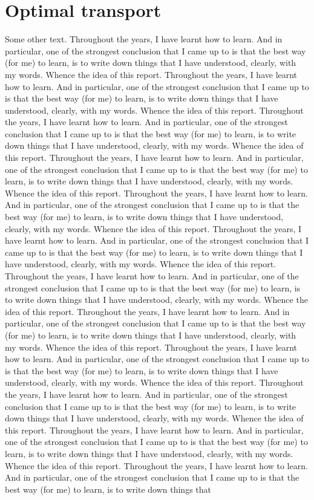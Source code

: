\documentclass[12pt]{book}
\begin{document}
\chapter*{Optimal transport}
Some other text. Throughout the years, I have learnt how to learn. And in particular, one of the strongest conclusion that I came up to is that the best way (for me) to learn, is to write down things that I have understood, clearly, with my words. Whence the idea of this report. Throughout the years, I have learnt how to learn. And in particular, one of the strongest conclusion that I came up to is that the best way (for me) to learn, is to write down things that I have understood, clearly, with my words. Whence the idea of this report. Throughout the years, I have learnt how to learn. And in particular, one of the strongest conclusion that I came up to is that the best way (for me) to learn, is to write down things that I have understood, clearly, with my words. Whence the idea of this report. Throughout the years, I have learnt how to learn. And in particular, one of the strongest conclusion that I came up to is that the best way (for me) to learn, is to write down things that I have understood, clearly, with my words. Whence the idea of this report. Throughout the years, I have learnt how to learn. And in particular, one of the strongest conclusion that I came up to is that the best way (for me) to learn, is to write down things that I have understood, clearly, with my words. Whence the idea of this report. Throughout the years, I have learnt how to learn. And in particular, one of the strongest conclusion that I came up to is that the best way (for me) to learn, is to write down things that I have understood, clearly, with my words. Whence the idea of this report. Throughout the years, I have learnt how to learn. And in particular, one of the strongest conclusion that I came up to is that the best way (for me) to learn, is to write down things that I have understood, clearly, with my words. Whence the idea of this report. Throughout the years, I have learnt how to learn. And in particular, one of the strongest conclusion that I came up to is that the best way (for me) to learn, is to write down things that I have understood, clearly, with my words. Whence the idea of this report. Throughout the years, I have learnt how to learn. And in particular, one of the strongest conclusion that I came up to is that the best way (for me) to learn, is to write down things that I have understood, clearly, with my words. Whence the idea of this report. Throughout the years, I have learnt how to learn. And in particular, one of the strongest conclusion that I came up to is that the best way (for me) to learn, is to write down things that I have understood, clearly, with my words. Whence the idea of this report. Throughout the years, I have learnt how to learn. And in particular, one of the strongest conclusion that I came up to is that the best way (for me) to learn, is to write down things that I have understood, clearly, with my words. Whence the idea of this report. Throughout the years, I have learnt how to learn. And in particular, one of the strongest conclusion that I came up to is that the best way (for me) to learn, is to write down things that 
\end{document}
